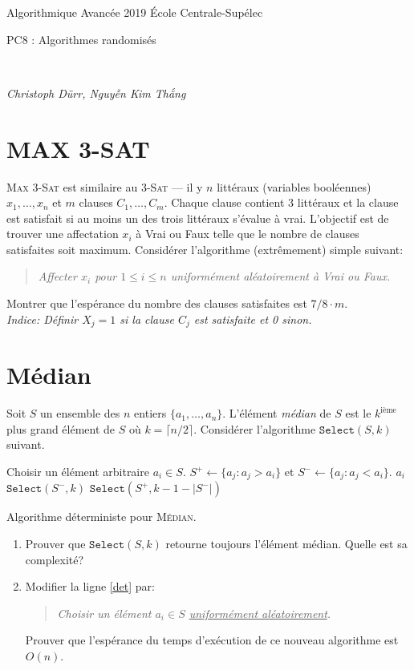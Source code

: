 \documentclass[12pt]{article}
\newcommand{\MakeScribeTop}[1]{
\noindent
\begin{framed}
\noindent
 Algorithmique Avancée 2019
 \hfill
 École Centrale-Supélec
 \\[1em]
 \centerline{ \Large
#1
 }
 \\[1em]
\centerline{  \it Christoph Dürr, Nguyễn Kim Thắng}
\end{framed}
}
\begin{document}
    \MakeScribeTop{PC8 : Algorithmes randomisés}



\section{MAX 3-SAT}

\textsc{Max 3-Sat} est similaire au \textsc{3-Sat} --- il y $n$ littéraux (variables booléennes) $x_{1}, \ldots, x_{n}$
et $m$ clauses $C_{1}, \ldots, C_{m}$. Chaque clause contient 3 littéraux et la clause est satisfait si au moins un des trois littéraux
s'évalue à vrai. L'objectif est de trouver une affectation $x_{i}$ à \textsf{Vrai} ou \textsf{Faux} telle que le nombre de clauses 
satisfaites soit maximum.
Considérer l'algorithme (extrêmement) simple suivant:

\begin{quote}
	\em Affecter $x_{i}$ pour $1 \leq i \leq n$ uniformément aléatoirement à \textsf{Vrai} ou \textsf{Faux}. 
\end{quote} 

Montrer que l'espérance du nombre des clauses satisfaites est $7/8 \cdot m$.\\
\emph{Indice: Définir $X_{j} = 1$ si la clause $C_{j}$ est satisfaite et 0 sinon.}

\section{Médian}

Soit $S$ un ensemble des $n$ entiers $\{a_{1}, \ldots, a_{n}\}$.
L'élément \emph{médian} de $S$ est le $k^{\text{ième}}$ plus grand élément de $S$
où $k = \lceil n/2 \rceil$. Considérer l'algorithme $\texttt{Select}(S,k)$ suivant.

\begin{algorithm}[ht]
\begin{algorithmic}[1]  
\STATE Choisir un élément arbitraire $a_{i} \in S$.	\label{det}
\STATE $S^{+} \gets \{a_{j}: a_{j} > a_{i}\}$ et $S^{-} \gets \{a_{j}: a_{j} < a_{i}\}$.
	\RETURN $a_{i}$
\ELSE
		\RETURN $\texttt{Select}(S^{-},k)$
		\RETURN $\texttt{Select}(S^{+},k - 1 - |S^{-}|)$
	\ENDIF
\ENDIF
\end{algorithmic}
\caption{Algorithme déterministe pour \textsc{Médian}.}
\label{algo:median}
\end{algorithm}

\begin{enumerate}
	\item Prouver que $\texttt{Select}(S,k)$ retourne toujours l'élément médian. Quelle est sa complexité?
	\item Modifier la ligne \ref{det} par:
		\begin{quote}
			\em  Choisir un élément $a_{i} \in S$ \underline{uniformément aléatoirement}.
		\end{quote} 
		Prouver que l'espérance du temps d'exécution de ce nouveau algorithme est $O(n)$. 
\end{enumerate}
\end{document}
